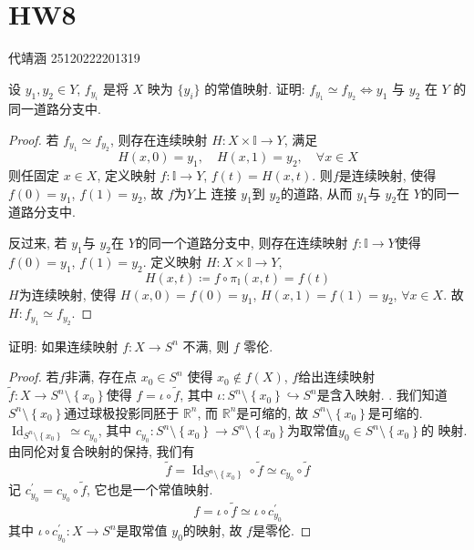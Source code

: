 \documentclass[../main.tex]{subfiles}
\begin{document}
\ifSubfilesClassLoaded{

    
    \setcounter{chapter}{7}
}{}

\chapter{ HW8 }
 代靖涵 25120222201319
\begin{exercise}{}{}
设 $y_1, y_2 \in Y$, $f_{y_i}$ 是将 $X$ 映为 $\{y_i\}$ 的常值映射. 证明: $f_{y_1} \simeq f_{y_2} \Longleftrightarrow y_1$ 与 $y_2$ 在 $Y$ 的同一道路分支中.
\end{exercise}
\begin{proof}
    若 \(  f_{y_1}\simeq f_{y_2}  \), 则存在连续映射 \(  H: X\times \mathbb{I}\to Y  \), 满足 \[
    H\left( x,0 \right)= y_1,\quad H\left( x,1 \right)= y_2,\quad \forall x \in X  
    \]  则任固定 \(  x \in X  \),  定义映射 \(  f:\mathbb{I}\to Y  \), \(  f\left( t \right)= H\left( x,t \right)    \).  则\(  f  \)是连续映射, 使得 \(  f\left( 0 \right)= y_1   \), \(  f\left( 1 \right)= y_2   \), 故 \(  f  \)为\(  Y  \)上 连接 \(  y_1  \)到 \(  y_2  \)的道路, 从而 \(  y_1  \)与 \(  y_2  \)在   \(  Y  \)的同一道路分支中.
    
    
    反过来, 若 \(  y_1  \)与 \(  y_2  \)在 \(  Y  \)的同一个道路分支中, 则存在连续映射 \(  f:\mathbb{I}\to Y  \)使得 \(  f\left( 0 \right)= y_1   \), \(  f\left( 1 \right)= y_2   \). 定义映射 \(  H: X \times \mathbb{I}\to Y  \), \[
    H\left( x,t \right)\coloneqq   f\circ  \pi _{\mathbb{I}}\left( x,t \right)  =   f\left( t \right)
    \]       \(  H  \)为连续映射, 使得 \(  H\left( x,0 \right)= f\left( 0 \right)= y_1    \), \(  H\left( x,1 \right)= f\left( 1 \right)= y_2    \), \(  \forall x \in X  \). 故 \(  H: f_{y_1}\simeq f_{y_2}  \).     
\end{proof}
\begin{exercise}{}{}
证明: 如果连续映射 $f: X \to S^n$ 不满, 则 $f$ 零伦.
\end{exercise}
\begin{proof}
    若\(  f  \)非满, 存在点 \(  x_0\in S^{n}\)  使得 \(  x_0\not \in f\left( X \right)   \), \(  f  \)给出连续映射 \(  \tilde{f}:X\to S^{n}\setminus \left\{ x_0 \right\}  \)使得 \(  f= \iota \circ \tilde{f}  \), 其中 \(  \iota : S^{n}\setminus \left\{ x_0 \right\}\hookrightarrow S^{n}  \)是含入映射.    .  我们知道 \(  S^{n}\setminus \left\{ x_0 \right\}  \)通过球极投影同胚于 \(  \mathbb{R} ^{n}  \), 而 \(  \mathbb{R} ^{n}  \)是可缩的, 故 \(  S^{n}\setminus \left\{ x_0 \right\}  \)是可缩的.   \(  \operatorname{Id}_{S^{n}\setminus \left\{ x_0 \right\}}  \simeq c_{y_0}\), 其中 \(  c_{y_0} : S^{n}\setminus \left\{ x_0 \right\}\to S^{n}\setminus \left\{ x_0 \right\} \)为取常值\(  y_0\in S^{n} \setminus \left\{ x_0 \right\} \)的 映射.  由同伦对复合映射的保持, 我们有 \[
    \tilde{f}= \operatorname{Id}_{S^{n}\setminus \left\{ x_0 \right\}}\circ \tilde{f}\simeq c_{y_0}\circ \tilde{f}
    \]记 \(  c^{\prime}_{y_0} = c_{y_0}\circ \tilde{f}  \), 它也是一个常值映射.  \[
    f= \iota \circ \tilde{f}\simeq  \iota \circ c^{\prime} _{y_0}
    \]其中 \( \iota \circ c^{\prime} _{y_0}: X\to S^{n}  \)是取常值 \(  y_0  \)的映射, 故 \(  f  \)是零伦. 
\end{proof}
\end{document}
